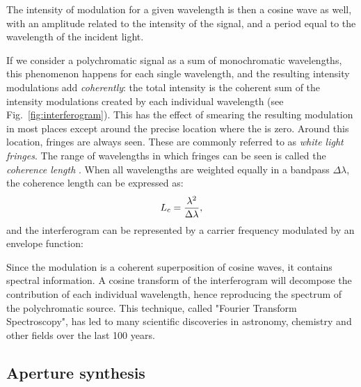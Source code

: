 The intensity of modulation for a given wavelength is then a cosine wave as well, with an amplitude related to the intensity of the signal, and a period equal to the wavelength of the incident light.

If we consider a polychromatic signal as a sum of monochromatic wavelengths, this phenomenon happens for each single wavelength, and the resulting intensity modulations add \textit{coherently}: the total intensity is the coherent sum of the intensity modulations created by each individual wavelength (see Fig.~\ref{fig:interferogram}). This has the effect of smearing the resulting modulation in most places except around the precise location where the \OPD is zero. Around this location, fringes are always seen. These are commonly referred to as \textit{white light fringes}. The range of wavelengths in which fringes can be seen is called the \textit{coherence length} \Lc. When all wavelengths are weighted equally in a bandpass $\Delta\lambda$, the coherence length can be expressed as:
\begin{equation}
L_c = \frac{\lambda^2}{\Delta\lambda},
\end{equation}
and the interferogram can be represented by a carrier frequency modulated by an envelope function:


Since the modulation is a coherent superposition of cosine waves, it contains spectral information. A cosine transform of the interferogram will decompose the contribution of each individual wavelength, hence reproducing the spectrum of the polychromatic source. This technique, called "Fourier Transform Spectroscopy", has led to many scientific discoveries in astronomy, chemistry and other fields over the last 100 years.

\subsection{Aperture synthesis}



